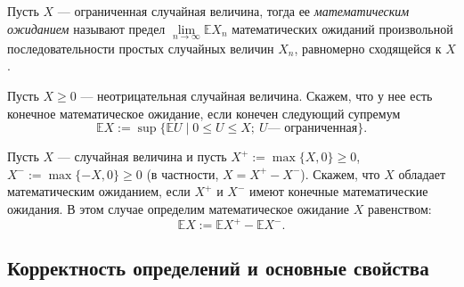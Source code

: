 
\begin{definition*}
    Пусть $X$ --- ограниченная случайная величина, тогда ее {\it математическим ожиданием} называют предел $\lim\limits_{n \to \infty}\mathbb{E} X_n$ математических ожиданий произвольной последовательности простых случайных величин $X_n$, равномерно сходящейся к $X$.
\end{definition*}

\begin{definition*}
    Пусть $X \geqslant 0$ --- неотрицательная случайная величина.
    Скажем, что у нее есть конечное математическое ожидание, если конечен следующий супремум
    \[
        \mathbb{E} X := \sup\{\mathbb{E} U \mid 0 \leqslant U \leqslant X;~ U \text{--- ограниченная}\}.
    \]
\end{definition*}

\begin{definition*}
    Пусть $X$ --- случайная величина и пусть $X^+ := \max\{X, 0\} \geqslant 0$, $X^- := \max\{-X, 0\} \geqslant 0$ (в частности, $X = X^+ - X^-$).
    Скажем, что $X$ обладает математическим ожиданием, если $X^+$ и $X^-$ имеют конечные математические ожидания.
    В этом случае определим математическое ожидание $X$ равенством:
    \[
        \mathbb{E} X := \mathbb{E}X^+ - \mathbb{E}X^-.
    \]
\end{definition*}

\sectionbreak
\subsection{Корректность определений и основные свойства}

